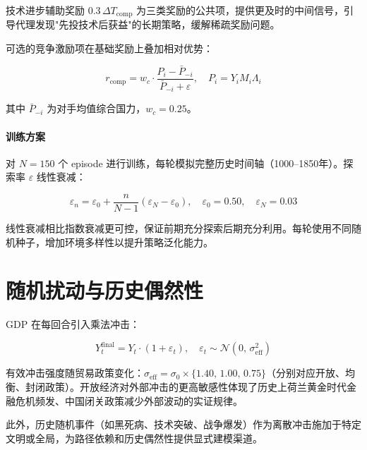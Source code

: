 \documentclass[12pt, a4paper]{article}
\begin{document}
技术进步辅助奖励 $0.3\,\Delta T_{\text{comp}}$ 为三类奖励的公共项，提供更及时的中间信号，引导代理发现"先投技术后获益"的长期策略，缓解稀疏奖励问题。

可选的竞争激励项在基础奖励上叠加相对优势：

\begin{equation}
r_{\text{comp}} = w_c \cdot \frac{P_i - \bar{P}_{-i}}{\bar{P}_{-i} + \varepsilon}, \quad P_i = Y_i M_i \Lambda_i
\label{eq:competitive}
\end{equation}

其中 $\bar{P}_{-i}$ 为对手均值综合国力，$w_c = 0.25$。

\paragraph{训练方案}对 $N=150$ 个 episode 进行训练，每轮模拟完整历史时间轴（1000--1850年）。探索率 $\varepsilon$ 线性衰减：

\begin{equation}
\varepsilon_n = \varepsilon_0 + \frac{n}{N-1}(\varepsilon_N - \varepsilon_0), \quad \varepsilon_0 = 0.50,\quad \varepsilon_N = 0.03
\label{eq:epsilon_decay}
\end{equation}

线性衰减相比指数衰减更可控，保证前期充分探索后期充分利用。每轮使用不同随机种子，增加环境多样性以提升策略泛化能力。

\section{随机扰动与历史偶然性}

GDP 在每回合引入乘法冲击：

\begin{equation}
Y_t^{\text{final}} = Y_t \cdot (1 + \varepsilon_t), \quad \varepsilon_t \sim \mathcal{N}(0,\, \sigma_{\text{eff}}^2)
\label{eq:shock}
\end{equation}

有效冲击强度随贸易政策变化：$\sigma_{\text{eff}} = \sigma_0 \times \{1.40,\, 1.00,\, 0.75\}$（分别对应开放、均衡、封闭政策）。开放经济对外部冲击的更高敏感性体现了历史上荷兰黄金时代金融危机频发、中国闭关政策减少外部波动的实证规律。

此外，历史随机事件（如黑死病、技术突破、战争爆发）作为离散冲击施加于特定文明或全局，为路径依赖和历史偶然性提供显式建模渠道。
\end{document}
